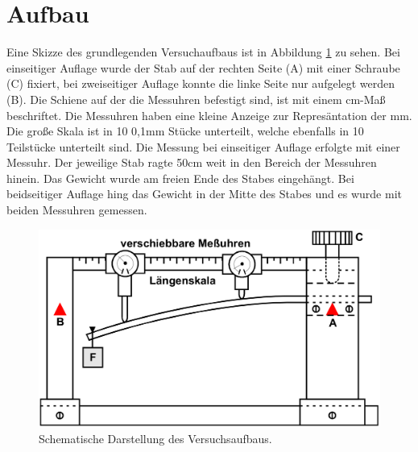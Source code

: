 \section{Aufbau}
\label{sec:Aufbau}
Eine Skizze des grundlegenden Versuchaufbaus ist in Abbildung \ref{fig:aufbau}
zu sehen. Bei einseitiger Auflage wurde der Stab auf der rechten Seite (A)
mit einer Schraube (C) fixiert,
bei zweiseitiger Auflage konnte die linke Seite nur aufgelegt werden (B).
Die Schiene auf der die Messuhren befestigt sind,
ist mit einem cm-Maß beschriftet.
Die Messuhren haben eine kleine Anzeige zur Represäntation der mm.
Die große Skala ist in 10 0,1mm Stücke unterteilt,
welche ebenfalls in 10 Teilstücke unterteilt sind.
Die Messung bei einseitiger Auflage erfolgte mit einer Messuhr.
Der jeweilige Stab ragte 50cm weit in den Bereich der Messuhren hinein.
Das Gewicht wurde am freien Ende des Stabes eingehängt.
Bei beidseitiger Auflage hing das Gewicht in der Mitte des Stabes
und es wurde mit beiden Messuhren gemessen.

\begin{figure}
  \centering
  \includegraphics[width=\textwidth]{content/aufbau.jpg}
  \caption{Schematische Darstellung des Versuchsaufbaus. \cite{Anleitung}}
  \label{fig:aufbau}
\end{figure}

